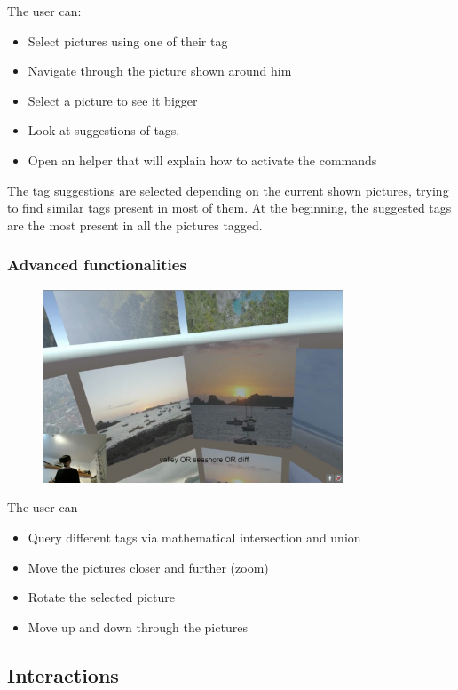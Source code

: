 \documentclass[11pt,a4paper]{article}
\begin{document}
The user can:
\begin{itemize}
\item Select pictures using one of their tag
\item Navigate through the picture shown around him
\item Select a picture to see it bigger 
\item Look at suggestions of tags.
\item Open an helper that will explain how to activate the commands
\end{itemize} 
The tag suggestions are selected depending on the current shown pictures, trying to find similar tags present in most of them.
At the beginning, the suggested tags are the most present in all the pictures tagged.


\subsubsection{Advanced functionalities}

\begin{figure}[H]
  \label{fig:3tag}
  \centering
  \includegraphics[width=0.8\textwidth]{img/TripleTag.jpg}
\end{figure}

The user can
\begin{itemize}
\item Query different tags via mathematical intersection and union
\item Move the pictures closer and further (zoom)
\item Rotate the selected picture
\item Move up and down through the pictures
\end{itemize}

\subsection{Interactions}
\end{document}
